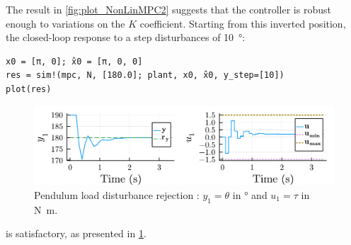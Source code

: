 The result in \cref{fig:plot_NonLinMPC2} suggests that the controller is robust enough to variations on the $K$ coefficient. Starting from this inverted position, the closed-loop response to a step disturbances of \SI{10}{\degree}:

\begin{verbatim}
x0 = [π, 0]; x̂0 = [π, 0, 0]
res = sim!(mpc, N, [180.0]; plant, x0, x̂0, y_step=[10])
plot(res)
\end{verbatim}

\begin{figure}[h]
    \centering
    \includegraphics[width=\columnwidth]{fig/plot_NonLinMPC3.pdf}
    \caption{Pendulum load disturbance rejection : $y_1 = \theta$ in \si{\degree} and $u_1 = \tau$ in \si{\newton\meter}.}
    \label{fig:plot_NonLinMPC3}
\end{figure}

is satisfactory, as presented in \cref{fig:plot_NonLinMPC3}.

